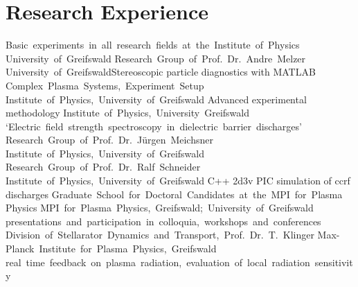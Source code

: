 \documentclass[11pt,a4paper]{moderncv}
\begin{document}
    \section{Research Experience}
        {Basic~experiments~in~all~research~fields~at~the~Institute~of~Physics\newline}{}%
        {University~of~Greifswald}{}
        {Research~Group~of~Prof.~Dr.~Andre~Melzer\newline}{}%
        {University~of~Greifswald\newline}{Stereoscopic particle diagnostics with MATLAB}
        {Complex~Plasma~Systems,~Experiment~Setup\newline}{}%
        {Institute~of~Physics,~University~of~Greifswald}{}
        {Advanced experimental methodology\newline}{}%
        {Institute~of~Physics,~University~Greifswald}{}
        {`Electric~field~strength~spectroscopy~in~dielectric~barrier~discharges'\newline}{}%
        {Research~Group~of~Prof.~Dr.~Jürgen~Meichsner\newline}%
        {Institute~of~Physics,~University~of~Greifswald}
        {Research~Group~of~Prof.~Dr.~Ralf~Schneider\newline}{}%
        {Institute~of~Physics,~University~of~Greifswald\newline}%
        {C++ 2d3v PIC simulation of ccrf discharges}
        {Graduate~School~for~Doctoral~Candidates~at~the~MPI~for~Plasma Physics\newline}{}%
        {MPI~for~Plasma~Physics,~Greifswald;~University~of~Greifswald\newline}%
        {presentations~and~participation~in~colloquia,~workshops~and~conferences}
        {Division~of~Stellarator~Dynamics~and~Transport,~Prof.~Dr.~T.~Klinger\newline}{}%
        {Max-Planck~Institute~for~Plasma~Physics,~Greifswald\newline}%
        {real~time~feedback~on~plasma~radiation,~evaluation~of~local~radiation~sensitivity}
\end{document}
